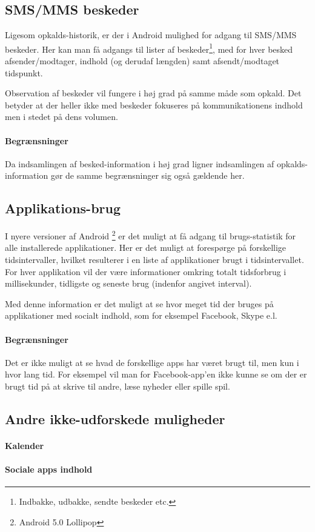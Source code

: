 \subsection{SMS/MMS beskeder}
Ligesom opkalds-historik, er der i Android mulighed for adgang til SMS/MMS beskeder.
Her kan man få adgangs til lister af beskeder\footnote{Indbakke, udbakke, sendte beskeder etc.}, med for hver besked afsender/modtager, indhold (og derudaf længden) samt afsendt/modtaget tidspunkt.

Observation af beskeder vil fungere i høj grad på samme måde som opkald.
Det betyder at der heller ikke med beskeder fokuseres på kommunikationens indhold men i stedet på dens volumen.

\paragraph{Begrænsninger}
Da indsamlingen af besked-information i høj grad ligner indsamlingen af opkalds-information gør de samme begrænsninger sig også gældende her.

\subsection{Applikations-brug}
I nyere versioner af Android \footnote{Android 5.0 Lollipop} er det muligt at få adgang til brugs-statistik for alle installerede applikationer.
Her er det muligt at forespørge på forskellige tidsintervaller, hvilket resulterer i en liste af applikationer brugt i tidsintervallet.
For hver applikation vil der være informationer omkring totalt tidsforbrug i millisekunder, tidligste og seneste brug (indenfor angivet interval).

Med denne information er det muligt at se hvor meget tid der bruges på applikationer med socialt indhold, som for eksempel Facebook, Skype e.l.

\paragraph{Begrænsninger}
Det er ikke muligt at se hvad de forskellige apps har været brugt til, men kun i hvor lang tid.
For eksempel vil man for Facebook-app'en ikke kunne se om der er brugt tid på at skrive til andre, læse nyheder eller spille spil.

\subsection{Andre ikke-udforskede muligheder}

\paragraph{Kalender}

\paragraph{Sociale apps indhold}
